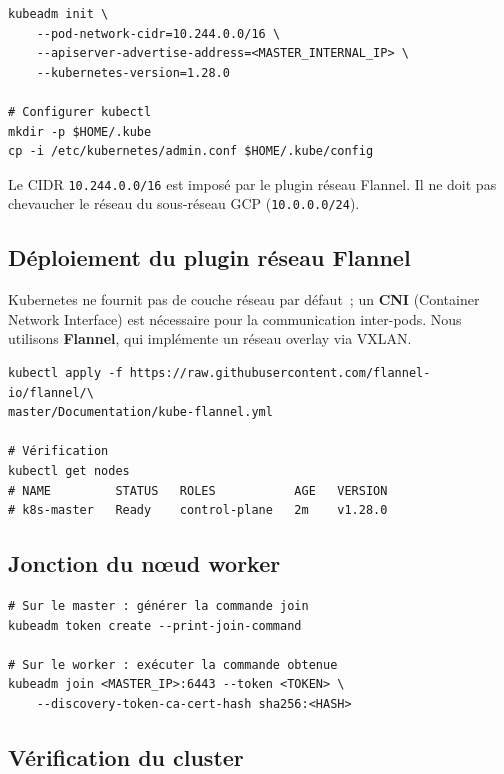 \documentclass[12pt,a4paper,french]{report}
\newcommand{\kw}[1]{\textbf{#1}}
\begin{document}
\begin{lstlisting}[style=bash, caption={Initialisation du master avec kubeadm}]
kubeadm init \
    --pod-network-cidr=10.244.0.0/16 \
    --apiserver-advertise-address=<MASTER_INTERNAL_IP> \
    --kubernetes-version=1.28.0

# Configurer kubectl
mkdir -p $HOME/.kube
cp -i /etc/kubernetes/admin.conf $HOME/.kube/config
\end{lstlisting}

\begin{warnbox}
Le CIDR \texttt{10.244.0.0/16} est imposé par le plugin réseau Flannel. Il ne doit pas chevaucher le réseau du sous-réseau GCP (\texttt{10.0.0.0/24}).
\end{warnbox}

\subsection{Déploiement du plugin réseau Flannel}

Kubernetes ne fournit pas de couche réseau par défaut~; un \kw{CNI} (Container Network Interface) est nécessaire pour la communication inter-pods. Nous utilisons \kw{Flannel}, qui implémente un réseau overlay via VXLAN.

\begin{lstlisting}[style=bash, caption={Déploiement de Flannel}]
kubectl apply -f https://raw.githubusercontent.com/flannel-io/flannel/\
master/Documentation/kube-flannel.yml

# Vérification
kubectl get nodes
# NAME         STATUS   ROLES           AGE   VERSION
# k8s-master   Ready    control-plane   2m    v1.28.0
\end{lstlisting}

\subsection{Jonction du nœud worker}

\begin{lstlisting}[style=bash, caption={Join du worker au cluster}]
# Sur le master : générer la commande join
kubeadm token create --print-join-command

# Sur le worker : exécuter la commande obtenue
kubeadm join <MASTER_IP>:6443 --token <TOKEN> \
    --discovery-token-ca-cert-hash sha256:<HASH>
\end{lstlisting}

\subsection{Vérification du cluster}
\end{document}
